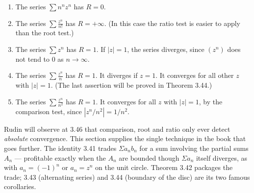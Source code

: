 \begin{enumerate}[label=(\alph*), leftmargin=2.2em, itemsep=2pt, topsep=4pt]
  \item The series $\sum n^nz^n$ has $R = 0$.
  \item The series $\displaystyle\sum \frac{z^n}{n!}$ has $R = +\infty$. (In
        this case the ratio test is easier to apply than the root test.)
  \item The series $\sum z^n$ has $R = 1$. If $|z| = 1$, the series diverges,
        since $(z^n)$ does not tend to $0$ as $n \to \infty$.
  \item The series $\displaystyle\sum \frac{z^n}{n}$ has $R = 1$. It diverges
        if $z = 1$. It converges for all other $z$ with $|z| = 1$. (The last
        assertion will be proved in Theorem 3.44.)
  \item The series $\displaystyle\sum \frac{z^n}{n^2}$ has $R = 1$. It
        converges for all $z$ with $|z| = 1$, by the comparison test, since
        $|z^n/n^2| = 1/n^2$.
\end{enumerate}

\begin{center}
\end{center}


\begin{signpost}
Rudin will observe at 3.46 that comparison, root and ratio only ever detect
\emph{absolute} convergence. This section supplies the single technique in the
book that goes further. The identity 3.41 trades $\Sigma a_nb_n$ for a sum
involving the partial sums $A_n$ --- profitable exactly when the $A_n$ are
bounded though $\Sigma a_n$ itself diverges, as with $a_n = (-1)^n$ or
$a_n = z^n$ on the unit circle. Theorem 3.42 packages the trade; 3.43
(alternating series) and 3.44 (boundary of the disc) are its two famous
corollaries.
\end{signpost}

